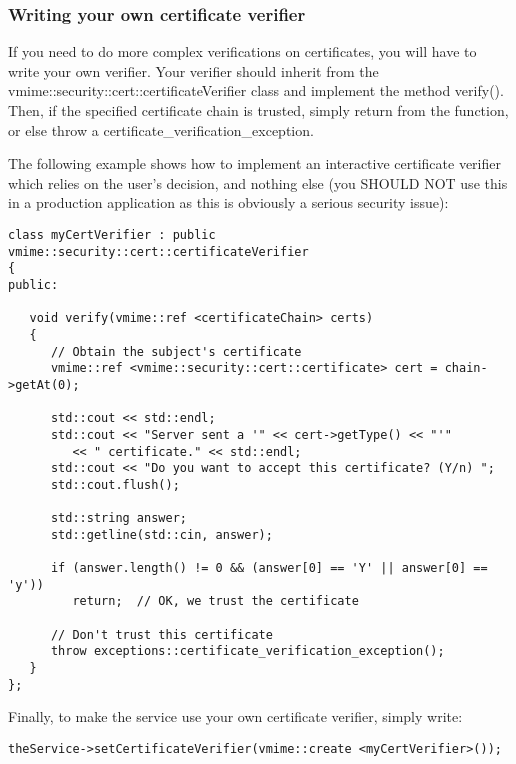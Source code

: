 \subsubsection{Writing your own certificate verifier} %

If you need to do more complex verifications on certificates, you will have to
write your own verifier. Your verifier should inherit from the
{\vcode vmime::security::cert::certificateVerifier} class and implement the
method {\vcode verify()}. Then, if the specified certificate chain is trusted,
simply return from the function, or else throw a
{\vcode certificate\_verification\_exception}.

The following example shows how to implement an interactive certificate
verifier which relies on the user's decision, and nothing else (you SHOULD NOT
use this in a production application as this is obviously a serious security
issue):

\begin{lstlisting}[caption={A custom certificate verifier}]
class myCertVerifier : public vmime::security::cert::certificateVerifier
{
public:

   void verify(vmime::ref <certificateChain> certs)
   {
      // Obtain the subject's certificate
      vmime::ref <vmime::security::cert::certificate> cert = chain->getAt(0);

      std::cout << std::endl;
      std::cout << "Server sent a '" << cert->getType() << "'"
         << " certificate." << std::endl;
      std::cout << "Do you want to accept this certificate? (Y/n) ";
      std::cout.flush();

      std::string answer;
      std::getline(std::cin, answer);

      if (answer.length() != 0 && (answer[0] == 'Y' || answer[0] == 'y'))
         return;  // OK, we trust the certificate

      // Don't trust this certificate
      throw exceptions::certificate_verification_exception();
   }
};
\end{lstlisting}


Finally, to make the service use your own certificate verifier, simply write:

\begin{lstlisting}
theService->setCertificateVerifier(vmime::create <myCertVerifier>());
\end{lstlisting}

